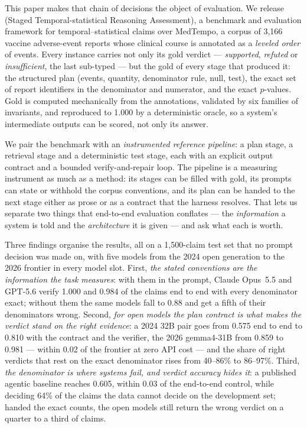 This paper makes that chain of decisions the object of evaluation. We release
\sys{} (Staged Temporal-statistical Reasoning Assessment), a benchmark and evaluation framework for temporal--statistical claims over MedTempo, a corpus of
3{,}166 vaccine adverse-event reports whose clinical course is annotated as a
\emph{leveled order} of events. Every instance carries not only its gold
verdict --- \emph{supported}, \emph{refuted} or \emph{insufficient}, the last
sub-typed --- but the gold of every stage that produced it: the structured plan
(events, quantity, denominator rule, null, test), the exact set of report
identifiers in the denominator and numerator, and the exact $p$-values. Gold is
computed mechanically from the annotations, validated by six families of
invariants, and reproduced to 1.000 by a deterministic oracle, so a system's
intermediate outputs can be scored, not only its answer.

We pair the benchmark with an \emph{instrumented reference pipeline}: a plan
stage, a retrieval stage and a deterministic test stage, each with an explicit
output contract and a bounded verify-and-repair loop. The pipeline is a
measuring instrument as much as a method: its stages can be filled with gold,
its prompts can state or withhold the corpus conventions, and its plan can be
handed to the next stage either as prose or as a contract that the harness
resolves. That lets us separate two things that end-to-end evaluation
conflates --- the \emph{information} a system is told and the
\emph{architecture} it is given --- and ask what each is worth.

Three findings organise the results, all on a 1{,}500-claim test set that no
prompt decision was made on, with five models from the 2024 open generation
to the 2026 frontier in every model slot. First, \emph{the stated conventions
are the information the task measures}: with them in the prompt, Claude
Opus~5.5 and GPT-5.6 verify 1.000 and 0.984 of the claims end to end with
every denominator exact; without them the same models fall to 0.88 and get a
fifth of their denominators wrong. Second, \emph{for open models the plan
contract is what makes the verdict stand on the right evidence}: a 2024
32B pair goes from 0.575 end to end to 0.810 with the contract and the
verifier, the 2026 gemma4-31B from 0.859 to 0.981 --- within 0.02 of the
frontier at zero API cost --- and the share of right verdicts that rest on the
exact denominator rises from 40--86\% to 86--97\%. Third, \emph{the denominator
is where systems fail, and verdict accuracy hides it}: a published agentic
baseline reaches 0.605, within 0.03 of the end-to-end control, while deciding
64\% of the claims the data cannot decide on the development set; handed the
exact counts, the open models still return the wrong verdict on a quarter to a
third of claims.

